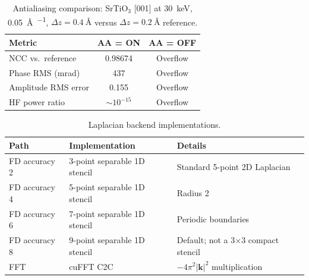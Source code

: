 \documentclass[twoside,11pt]{article}
\begin{document}
\begin{table}[H]
\centering
\caption{Antialiasing comparison: SrTiO$_3$ [001] at \SI{30}{\keV}, \SI{0.05}{\angstrom\per\pixel}, $\Delta z=\SI{0.4}{\angstrom}$ versus $\Delta z=\SI{0.2}{\angstrom}$ reference.}
\label{tab:S5}
\small
\begin{tabular}{lcc}
\toprule
Metric & AA = ON & AA = OFF \\
\midrule
NCC vs.\ reference & 0.98674 & Overflow \\
Phase RMS (mrad) & 437 & Overflow \\
Amplitude RMS error & 0.155 & Overflow \\
HF power ratio & $\sim10^{-15}$ & Overflow \\
\bottomrule
\end{tabular}
\end{table}

\begin{table}[H]
\centering
\caption{Laplacian backend implementations.}
\label{tab:S6}
\small
\begin{tabular}{lll}
\toprule
Path & Implementation & Details \\
\midrule
FD accuracy 2 & 3-point separable 1D stencil & Standard 5-point 2D Laplacian \\
FD accuracy 4 & 5-point separable 1D stencil & Radius 2 \\
FD accuracy 6 & 7-point separable 1D stencil & Periodic boundaries \\
FD accuracy 8 & 9-point separable 1D stencil & Default; not a 3$\times$3 compact stencil \\
FFT & cuFFT C2C & $-4\pi^2|\mathbf{k}|^2$ multiplication \\
\bottomrule
\end{tabular}
\end{table}
\end{document}
